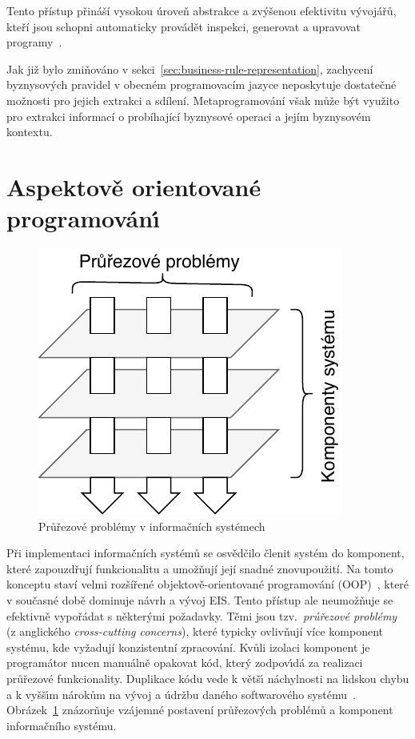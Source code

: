 Tento přístup přináší vysokou úroveň abstrakce a zvýšenou efektivitu
vývojářů, kteří jsou schopni automaticky provádět inspekci, generovat a upravovat
programy~\cite{sheard2001accomplishments}.

Jak již bylo zmiňováno v sekci~\ref{sec:business-rule-representation}, zachycení byznysových
pravidel v obecném programovacím jazyce neposkytuje dostatečné možnosti pro jejich extrakci
a sdílení. Metaprogramování však může být využito pro extrakci informací o probíhající
byznysové operaci a jejím byznysovém kontextu.

\section{Aspektově orientované programován\'{\i}}\label{sec:aop}

\begin{figure}[t]
    \centering
    \includegraphics[keepaspectratio=true, width=0.35\linewidth]{figures/cross-cutting.pdf}
    \caption{Průřezové problémy v informačních systémech}
    \label{fig:cross-cutting}
\end{figure}

Při implementaci informačních systémů se osvědčilo členit systém do komponent, které
zapouzdřují funkcionalitu a umožňují její snadné znovupoužití. Na tomto konceptu
staví velmi rozšířené objektově-orientované programování (\gls{OOP})~\cite{rentsch1982object},
které v současné době dominuje návrh a vývoj \gls{EIS}. Tento přístup ale neumožňuje se
efektivně vypořádat s některými požadavky.
Těmi jsou tzv.~\textit{průřezové problémy} (z anglického \textit{cross-cutting concerns}),
které typicky ovlivňují více komponent systému, kde vyžadují konzistentní zpracování.
Kvůli izolaci komponent je programátor nucen manuálně opakovat
kód, kter\'y zodpov\'{\i}dá za realizaci průřezové funkcionality. Duplikace kódu
vede k větš\'{\i} náchylnosti na lidskou chybu a k vyšš\'{\i}m nárokům na v\'yvoj
a údržbu daného softwarového systému~\cite{fowler1999refactoring}.
Obrázek~\ref{fig:cross-cutting} znázorňuje vzájemné postavení průřezových
problémů a komponent informačního systému.

